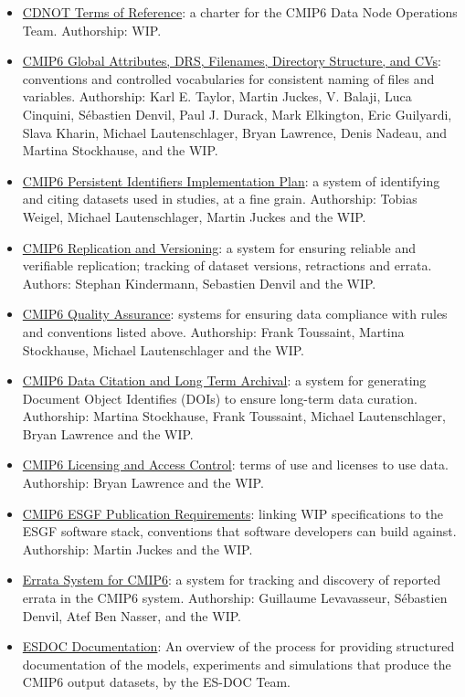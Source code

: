 \documentclass[gmd,manuscript]{copernicus}
\begin{document}
\begin{itemize}
\item \href{https://goo.gl/4A1Xtq}{CDNOT Terms of Reference}: a
  charter for the CMIP6 Data Node Operations Team. Authorship: WIP.
\item \href{https://goo.gl/mSe4rf}{CMIP6 Global Attributes, DRS,
    Filenames, Directory Structure, and CVs}: conventions and
  controlled vocabularies for consistent naming of files and
  variables. Authorship: Karl E. Taylor, Martin Juckes, V. Balaji,
  Luca Cinquini, Sébastien Denvil, Paul J. Durack, Mark Elkington,
  Eric Guilyardi, Slava Kharin, Michael Lautenschlager, Bryan
  Lawrence, Denis Nadeau, and Martina Stockhause, and the WIP.
\item \href{https://goo.gl/miUREw}{CMIP6 Persistent Identifiers
    Implementation Plan}: a system of identifying and citing datasets
  used in studies, at a fine grain. Authorship: Tobias Weigel, Michael
  Lautenschlager, Martin Juckes and the WIP.
\item \href{https://goo.gl/Bs4Qou}{CMIP6 Replication and Versioning}:
  a system for ensuring reliable and verifiable replication; tracking
  of dataset versions, retractions and errata. Authors: Stephan
  Kindermann, Sebastien Denvil and the WIP.
\item \href{https://goo.gl/eEr8bS}{CMIP6 Quality Assurance}: systems
  for ensuring data compliance with rules and conventions listed
  above. Authorship: Frank Toussaint, Martina Stockhause, Michael
  Lautenschlager and the WIP.
\item \href{https://goo.gl/BFn9Hq}{CMIP6 Data Citation and Long Term
    Archival}: a system for generating Document Object Identifies
  (DOIs) to ensure long-term data curation. Authorship: Martina
  Stockhause, Frank Toussaint, Michael Lautenschlager, Bryan Lawrence
  and the WIP.
\item \href{https://goo.gl/7vHsPU}{CMIP6 Licensing and Access
    Control}: terms of use and licenses to use data. Authorship: Bryan
  Lawrence and the WIP.
\item \href{https://goo.gl/jWfrWb}{CMIP6 ESGF Publication
    Requirements}: linking WIP specifications to the ESGF software
  stack, conventions that software developers can build against.
  Authorship: Martin Juckes and the WIP.
\item \href{https://goo.gl/fvVTVo}{Errata System for CMIP6}: a system
  for tracking and discovery of reported errata in the CMIP6 system.
  Authorship: Guillaume Levavasseur, Sébastien Denvil, Atef Ben
  Nasser, and the WIP.
\item \href{https://goo.gl/S3vVxE}{ESDOC Documentation}: An overview
  of the process for providing structured documentation of the models,
  experiments and simulations that produce the CMIP6 output datasets,
  by the ES-DOC Team.
\end{itemize}
\end{document}
